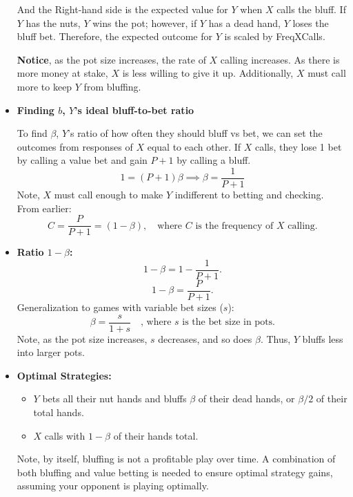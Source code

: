 \documentclass[12pt]{article}
\begin{document}
\begin{itemize}
    And the Right-hand side is the expected value for \(Y\) when \(X\) calls the bluff. If \(Y\) has the nuts, \(Y\) wins the pot; however, if \(Y\) has a dead hand, \(Y\) loses the bluff bet. Therefore, the expected outcome for \(Y\) is scaled by FreqXCalls.

    \textbf{Notice}, as the pot size increases, the rate of \(X\) calling increases. As there is more money at stake, \(X\) is less willing to give it up. Additionally, \(X\) must call more to keep \(Y\) from bluffing.

\item \textbf{Finding $b$, $Y$'s ideal bluff-to-bet ratio}

To find \(\beta\), \(Y\)'s ratio of how often they should bluff vs bet, we can set the outcomes from responses of \(X\) equal to each other. If \(X\) calls, they lose 1 bet by calling a value bet and gain \(P + 1\) by calling a bluff.  
\[
1 = (P + 1)\beta \implies \beta = \frac{1}{P+1}
\]
Note, \(X\) must call enough to make \(Y\) indifferent to betting and checking. From earlier:  
\[
C = \frac{P}{P+1} = (1-\beta), \quad \text{where } C \text{ is the frequency of } X \text{ calling.}
\]

\item \textbf{Ratio \(1-\beta\):}  
\[
1 - \beta = 1 - \frac{1}{P+1}.
\]
\[
1 - \beta = \frac{P}{P+1}.
\]
Generalization to games with variable bet sizes (\(s\)):  
\[
\beta = \frac{s}{1+s} \quad\text{, where } s \text{ is the bet size in pots.}
\]
Note, as the pot size increases, \(s\) decreases, and so does \(\beta\). Thus, \(Y\) bluffs less into larger pots.

\item \textbf{Optimal Strategies:}
\begin{itemize}
    \item \(Y\) bets all their nut hands and bluffs $\beta$ of their dead hands, or \(\beta/2\) of their total hands.
    \item \(X\) calls with \(1 - \beta\) of their hands total.
\end{itemize}
    Note, by itself, bluffing is not a profitable play over time. A combination of both bluffing and value betting is needed to ensure optimal strategy gains, assuming your opponent is playing optimally.
    

\end{itemize}
\end{document}
